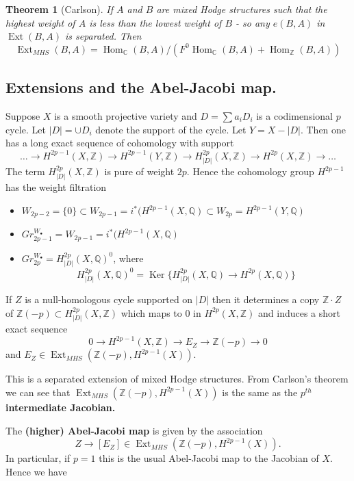 \documentclass[12pt,reqno]{article}
\newtheorem{thm}[defn]{Theorem}
\newcommand {\ZZ}{{\mathds Z}}
\newcommand {\C}{{\mathds C}}
\newcommand {\Q}{{\mathds Q}}
\def\Ker{\operatorname{Ker}}
\def\Hom{\operatorname{Hom}}
\def\Ext{\operatorname{Ext}}
\begin{document}
	\begin{thm}[Carlson] If $A$ and $B$ are  mixed Hodge structures such that the highest weight of $A$ is less than the lowest weight of $B$ - so any $e(B,A)$ in $\Ext(B,A)$ is separated. Then 
		$$\Ext_{MHS}(B,A)=\Hom_{\C}(B,A)/(F^0 \Hom_{\C}(B,A)+\Hom_{\ZZ}(B,A))$$
		
		\end{thm}	 
		
		\subsection{Extensions and the Abel-Jacobi map.} 
	
	Suppose $X$ is a smooth projective variety and $D=\sum a_i D_i$ is a codimensional $p$ cycle. Let $|D|=\cup D_i$   denote the support of the cycle. Let $Y=X-|D|$. Then one has a long exact sequence of cohomology with support 
	$$\dots \rightarrow  H^{2p-1}(X,\ZZ) \rightarrow H^{2p-1}(Y,\ZZ)\rightarrow H^{2p}_{|D|}(X,\ZZ)\rightarrow  H^{2p}(X,\ZZ)\rightarrow \dots$$
	The term $H^{2p}_{|D|}(X,\ZZ)$ is pure of weight $2p$. Hence the cohomology group $H^{2p-1}$ has the weight filtration 
	\begin{itemize}
		\item $W_{2p-2}=\{0\} \subset W_{2p-1}=i^*(H^{2p-1}(X,\Q)\subset W_{2p}= H^{2p-1}(Y,\Q)$
		\item $Gr_{2p-1}^{W_{\bullet}}=W_{2p-1}=i^*(H^{2p-1}(X,\Q)$
		\item $Gr_{2p}^{W_{\bullet}}=H^{2p}_{|D|}(X,\Q)^0$, where 
		$$H^{2p}_{|D|}(X,\Q)^0=\Ker\{H^{2p}_{|D|}(X,\Q) \rightarrow H^{2p}(X,\Q)\}$$
		
	\end{itemize}
	
	If $Z$ is a null-homologous cycle supported on $|D|$ then it determines a copy $\ZZ\cdot Z$ of $\ZZ(-p) \subset H^{2p}_{|D|}(X,\ZZ)$ which maps to $0$ in $H^{2p}(X,\ZZ)$ and  induces a short exact sequence 
	$$0 \rightarrow H^{2p-1}(X,\ZZ) \rightarrow E_Z \rightarrow \ZZ(-p) \rightarrow 0$$
	and $E_Z \in \Ext_{MHS}(\ZZ(-p),H^{2p-1}(X))$. 
	
	This is a separated extension of mixed Hodge structures. From Carlson's theorem we can see that $\Ext_{MHS}(\ZZ(-p),H^{2p-1}(X))$ is the same as the {\bf $p^{th}$ intermediate Jacobian.} 
	
	The {\bf (higher) Abel-Jacobi map} is given by the association 
	$$Z \rightarrow [E_Z] \in \Ext_{MHS}(\ZZ(-p),H^{2p-1}(X)).$$
	In particular, if $p=1$ this is the usual Abel-Jacobi map to the Jacobian of $X$. Hence we have 
	
\end{document}
